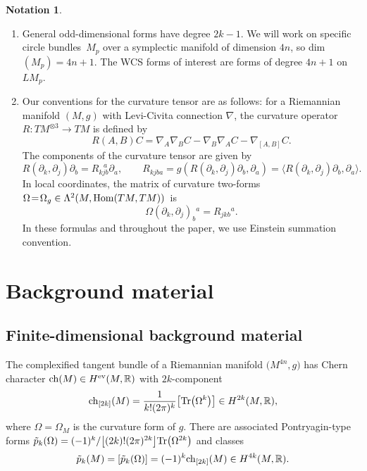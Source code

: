 \documentclass[pdftex]{sigma}
\numberwithin{equation}{section}
\theoremstyle{definition}
\newtheorem*{Notation}{Notation}
\newcommand{\BbR}{{\mathbb R}}
\newcommand{\R}{\BbR}
\newcommand{\Tr}{{\rm Tr}}
\newcommand{\br}{ R}
\newcommand{\tp}{\tilde p}
\begin{document}
\begin{Notation}\quad
\begin{enumerate}\itemsep=0pt
\item[(i)] General odd-dimensional forms have degree
$2k-1$. We will work on specific circle bundles~$M_p$ over a symplectic manifold of dimension $4n$, so dim$(M_p) = 4n+1$. The WCS forms of interest are forms of degree $4n+1$ on $LM_p$.

\item[(ii)] Our conventions for the curvature tensor are as follows: for a Riemannian manifold $(M,g)$ with Levi-Civita connection $\nabla$, the curvature operator $R\colon TM^{\otimes 3} \to TM$ is defined by
\[R(A, B) C = \nabla_{A} \nabla_{B} C - \nabla_{B} \nabla_{A} C - \nabla_{[A,B]} C.\]
The components of the curvature tensor are given by
\begin{equation}\label{curvconv}\br(\partial_k, \partial_j)\partial_b = \br_{kjb}^{\ \ \ a}\partial_a,\qquad
\br_{kjba} = g(\br(\partial_k,\partial_j)\partial_b,\partial_a) =
\langle \br(\partial_k,\partial_j)\partial_b,\partial_a\rangle.
\end{equation}
In local coordinates, the matrix of curvature two-forms $\Omega \!=\! \Omega_g\in \Lambda^2(M, {\rm Hom}(TM,TM))$~is%
\begin{equation}\label{eq:cc}\Omega(\partial_k,\partial_j)_b{}^a = R_{jkb}{}^a.
\end{equation}
In these formulas and throughout the paper, we use Einstein summation convention.
\end{enumerate}
\end{Notation}

\section{Background material}\label{section2}
\subsection{Finite-dimensional background material}%
The complexified tangent bundle
of a Riemannian manifold $\bigl(M^{4n},g\bigr)$ has Chern character
${\rm ch}(M) \in H^{{\rm ev}}(M,\R)$
with $2k$-component
\begin{equation}\label{onea}{\rm ch}_{[2k]}(M) = \frac{1}{k!(2\pi)^k}\bigl[\Tr\bigl(\Omega^k\bigr)\bigr]\in H^{2k}(M,\R),
\end{equation}
where $\Omega = \Omega_M$ is the curvature form of $g$. There are associated Pontryagin-type forms
$\tp_k(\Omega) = \smash{(-1)^k/\bigl[(2k)!(2\pi)^{2k}\bigr]\Tr\bigl(\Omega^{2k}\bigr)}$ and classes
\[\tp_{k}(M)= [ \tp_k(\Omega)] = (-1)^k {\rm ch}_{[2k]}(M)\in H^{4k}(M,\R).\]
\end{document}
